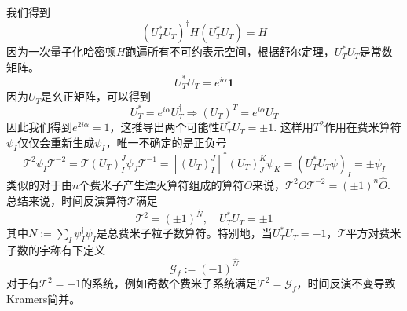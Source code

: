 \documentclass{article}
\numberwithin{equation}{subsection}
\newcommand{\mT}{\mathcal{T}}
\begin{document}
我们得到
\begin{equation}
    (U_T^*U_T)^\dagger H(U_T^*U_T)=H
\end{equation}
因为一次量子化哈密顿$H$跑遍所有不可约表示空间，根据舒尔定理，$U_T^* U_T$是常数矩阵。
\begin{equation}
    U_T^*U_T=e^{i\alpha}\mathbf{1}
\end{equation}
因为$U_T$是幺正矩阵，可以得到
\begin{equation}
    U_T^*=e^{i\alpha}U_T^\dagger\Rightarrow (U_T)^T=e^{i\alpha}U_T
\end{equation}
因此我们得到$e^{2i\alpha}=1$，这推导出两个可能性$U_T^*U_T=\pm 1$. 这样用$T^2$作用在费米算符$\psi_I$仅仅会重新生成$\psi_I$，唯一不确定的是正负号
\begin{equation}
    \mT^2\psi_I\mT^{-2}=\mT (U_T)_I^J \psi_J\mT^{-1}=[(U_T)_I^J]^*(U_T)_J^K\psi_K=(U_T^*U_T\psi)_I=\pm\psi_I
\end{equation}
类似的对于由$n$个费米子产生湮灭算符组成的算符$O$来说，$\mT^2\hat{O}\mT^{-2}=(\pm 1)^n\hat{O}$. 总结来说，时间反演算符$\mT$满足
\begin{equation}
    \mT^2=(\pm 1)^{\hat{N}},\quad U_T^*U_T=\pm 1
\end{equation}
其中$N:=\sum_I\psi_I^\dagger\psi_I$是总费米子粒子数算符。特别地，当$U_T^*U_T=-1$，$\mT$平方对费米子数的宇称有下定义
\begin{equation}
    \mathcal{G}_f:=(-1)^{\hat{N}}
\end{equation}
对于有$\mT^2=-1$的系统，例如奇数个费米子系统满足$\mT^2=\mathcal{G}_f$，时间反演不变导致Kramers简并。
\end{document}
